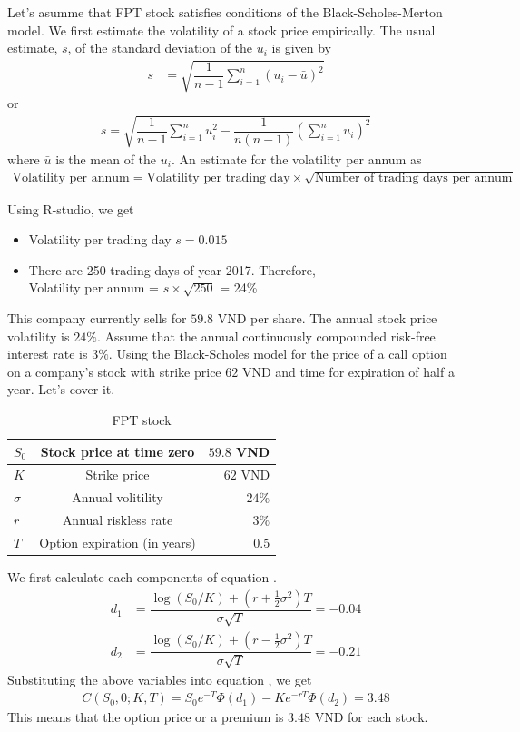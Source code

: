 Let's asumme that FPT stock satisfies conditions of the Black-Scholes-Merton model. We first estimate the volatility of a stock price empirically. The usual estimate, $s$, of the standard deviation of the $u_i$ is given by
\begin{align*}
	s&=\sqrt{\dfrac{1}{n-1}\sum_{i=1}^{n}(u_i-\bar{u})^2}
\end{align*}
or
\begin{align*}
 s=\sqrt{\dfrac{1}{n-1}\sum_{i=1}^{n}u_i^2-\dfrac{1}{n(n-1)}\left(\sum_{i=1}^{n}u_i\right)^2}
\end{align*}
where $\bar{u}$ is the mean of the $u_i$. An estimate for the volatility per annum as 
\begin{align*}
	\text{Volatility
	per annum} = \text{Volatility
	per trading day} \times \sqrt{\text{Number of trading days
		per annum}}
\end{align*}

\newpage
Using R-studio, we get 
\begin{itemize}
	\item Volatility
	per trading day $s = 0.015$
	\item There are 250 trading days of year 2017. Therefore,\\ Volatility
	per annum = $s\times \sqrt{250}$ = 24\%
\end{itemize}
This company currently sells for $59.8$ VND per share. The annual stock price volatility is $24\%$. Assume that the annual continuously compounded risk-free interest rate is $3\%$. Using the Black-Scholes model for the price of a call option on a company's stock with strike price $62$ VND and time for expiration of half a year. Let's cover it.
\begin{table}[!htp]
	\centering
	\begin{tabular}{|l|c|r|}
	\hline
	$S_0$ & Stock price at time zero   & $59.8$ VND\\
	\hline
	$K$ & Strike price  & $62$ VND\\
	\hline
	$\sigma$ &  Annual volitility & $24\%$\\
	\hline
	$r$ & Annual riskless rate  & $3\%$ \\
	\hline
	$T$ & Option expiration (in years)  & $0.5$\\
	\hline	
	\end{tabular}
	\caption{FPT stock}
	\label{B3.1}
\end{table}

We first calculate each components of equation . 
\begin{align*}
	d_1&=\dfrac{\log(S_0/K)+(r+ \frac{1}{2}\sigma^2)T}{\sigma \sqrt{T}}= -0.04\\
	d_2&=\dfrac{\log(S_0/K)+(r- \frac{1}{2}\sigma^2)T}{\sigma \sqrt{T}}=-0.21
\end{align*}
Substituting the above variables into equation , we get
\begin{align*}
	C(S_0,0;K,T)=S_0e^{-T}\Phi(d_1)-Ke^{-rT}\Phi(d_2)=3.48 
\end{align*}
This means that the option price or a premium is $3.48$ VND for each stock.